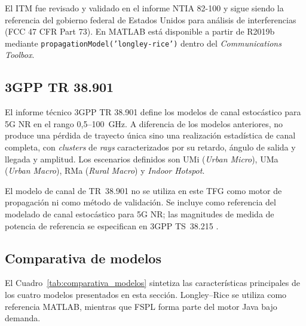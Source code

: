 El ITM fue revisado y validado en el informe NTIA 82-100 \cite{hufford1982guide} y sigue
siendo la referencia del gobierno federal de Estados Unidos para análisis de interferencias
(FCC 47 CFR Part 73). En MATLAB está disponible a partir de R2019b mediante
\texttt{propagationModel('longley-rice')} dentro del \textit{Communications Toolbox}.

\subsection{3GPP TR 38.901}
\label{subsec:tr38901}

El informe técnico 3GPP TR 38.901 \cite{3gpp_tr38901_2022} define los modelos de canal
estocástico para 5G NR en el rango 0,5--100~GHz. A diferencia de los modelos anteriores,
no produce una pérdida de trayecto única sino una realización estadística de canal completa,
con \textit{clusters} de \textit{rays} caracterizados por su retardo, ángulo de salida y
llegada y amplitud. Los escenarios definidos son UMi (\textit{Urban Micro}), UMa
(\textit{Urban Macro}), RMa (\textit{Rural Macro}) y \textit{Indoor Hotspot}.

El modelo de canal de TR~38.901 no se utiliza en este TFG como motor de propagación ni
como método de validación. Se incluye como referencia del modelado de canal estocástico
para 5G NR; las magnitudes de medida de potencia de referencia se especifican en
3GPP TS~38.215 \cite{3gpp_ts38215_2022}.

\subsection{Comparativa de modelos}
\label{subsec:comparativa_modelos}

El Cuadro~\ref{tab:comparativa_modelos} sintetiza las características principales de los
cuatro modelos presentados en esta sección. Longley--Rice se utiliza como referencia
MATLAB, mientras que FSPL forma parte del motor Java bajo demanda.

